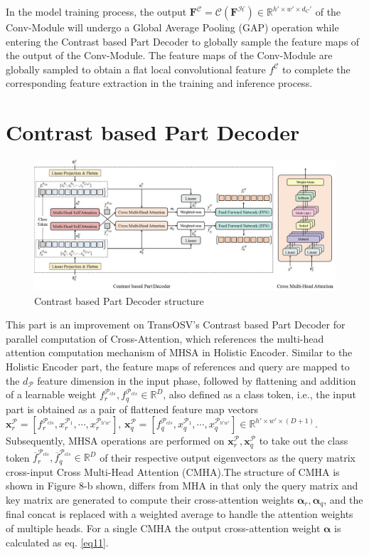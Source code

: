 In the model training process, the output $\mathbf{F}^\mathcal{C} = \mathcal{C}(\mathbf{F}^\mathcal{H} ) \in \mathbb{R}^{h'\times w'\times d_C' }$ of the Conv-Module will undergo a Global Average Pooling (GAP) operation while entering the Contrast based Part Decoder to globally sample the feature maps of the output of the Conv-Module. The feature maps of the Conv-Module are globally sampled to obtain a flat local convolutional feature $f^\mathcal{C}$ to complete the corresponding feature extraction in the training and inference process.

\section{Contrast based Part Decoder}

\begin{figure}[H]
  \centering
      \includegraphics[scale=0.45]{figure/decoder.jpg}
  \caption{Contrast based Part Decoder structure}
  \label{fig:decoder}
\end{figure}

This part is an improvement on TransOSV's Contrast based Part Decoder \cite{41} for parallel computation of Cross-Attention, which references the multi-head attention computation mechanism of MHSA in Holistic Encoder. Similar to the Holistic Encoder part, the feature maps of references and query are mapped to the $d_\mathcal{P}$ feature dimension in the input phase, followed by flattening and addition of a learnable weight $f_r^{\mathcal{P}_{cls}},f_q^{\mathcal{P}_{cls}} \in \mathbb{R}^D$, also defined as a class token, i.e., the input part is obtained as a pair of flattened feature map vectors $\boldsymbol{x}_r^\mathcal{P} = [f_r^{\mathcal{P}_{cls}}, x_r^{\mathcal{P}_1},\cdots ,x_r^{\mathcal{P}_{h' w' }} ]$, $\boldsymbol{x}_q^\mathcal{P}=[f_q^{\mathcal{P}_{cls}},x_q^{\mathcal{P}_1},\cdots,x_q^{\mathcal{P}_{h'w'} } ] \in \mathbb{R}^{h' \times w' \times (D+1)}$. Subsequently, MHSA operations are performed on $\boldsymbol{x}_r^\mathcal{P},\boldsymbol{x}_q^\mathcal{P}$ to take out the class token $\overline{f}_r^{\mathcal{P}_{cls}},\overline{f}_q^{\mathcal{P}_{cls}} \in \mathbb{R}^D$ of their respective output eigenvectors as the query matrix cross-input Cross Multi-Head Attention (CMHA).The structure of CMHA is shown in Figure 8-b shown, differs from MHA in that only the query matrix and key matrix are generated to compute their cross-attention weights $\boldsymbol{\alpha}_r,\boldsymbol{\alpha}_q$, and the final concat is replaced with a weighted average to handle the attention weights of multiple heads. For a single CMHA the output cross-attention weight $\boldsymbol{\alpha}$ is calculated as eq. \ref{eq11}.


